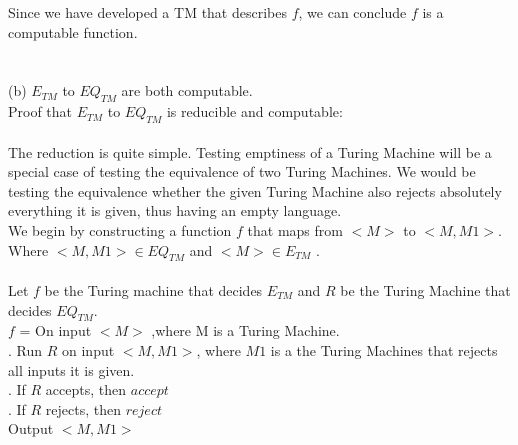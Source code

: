 \documentclass{report}
\begin{document}
Since we have developed a TM that describes $f$, we can conclude $f$ is a computable function.
\\ \\ \\
\indent (b) $ E_{TM}$ to $EQ_{TM} $ are both computable.\\
Proof that $ E_{TM}$ to $EQ_{TM} $ is reducible and computable: \\ \\
The reduction is quite simple. Testing emptiness of a Turing Machine will be a special case of testing the equivalence of two Turing Machines. We would be testing the equivalence whether the given Turing Machine also rejects absolutely everything it is given, thus having an empty language.  \\
We begin by constructing a function $f$ that maps from  $<M>$ to  $<M,M1>$. Where $<M,M1>\in EQ_{TM}$ and $<M> \in E_{TM}$ .\\ \\ Let $f$ be the Turing machine that decides $E_{TM}$ and $R$ be the Turing Machine that decides $EQ_{TM}$. \\

$f$ = On input $<M> $ ,where M is a Turing Machine.\\ 
. Run $R$ on input $<M,M1>$, where $M1$ is a the Turing Machines that rejects all inputs it is given. \\
. If $R$ accepts, then $accept$ \\
. If $R$ rejects, then $reject$ \\
Output $<M,M1>$






\end{document}
